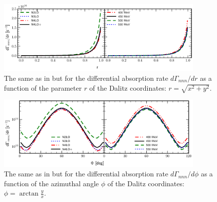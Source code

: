     \begin{figure}[h]
        \begin{center}
        \includegraphics[width=0.9\textwidth]{PlotData/PION/Dalitz_maps/figures/3H_dGdr.pdf}
        \end{center}
        \caption{The same as in  but for the differential absorption rate $d\Gamma_{nnn} /dr$
        as a function of the parameter $r$ of the Dalitz coordinates: $r = \sqrt{x^2 + y^2}$.}
        \label{pion_dGdr_3H}
    \end{figure}


    \begin{figure}[h]
        \begin{center}
        \includegraphics[width=0.9\textwidth]{PlotData/PION/Dalitz_maps/figures/3H_dGdphi.pdf}
        \end{center}
        \caption{The same as in  but for the differential absorption rate $d\Gamma_{nnn} /d\phi$
        as a function of the azimuthal angle $\phi$ of the Dalitz coordinates: $\phi = \arctan \frac{y}{x}$.}
        \label{pion_dGdphi_3H}
    \end{figure}
